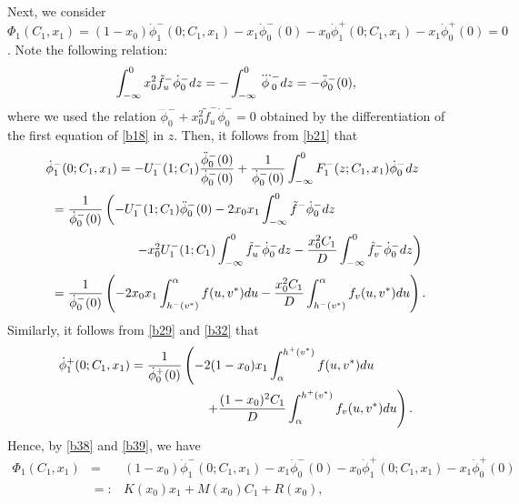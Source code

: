 \documentclass[a4,10pt]{article}
\begin{document}
Next, we consider
$\Phi_1(C_1,x_1) = (1-x_0) \dot{\phi}^-_1(0;C_1,x_1) - x_1  \dot{\phi}^-_0(0) - x_0  \dot{\phi}^+_1(0;C_1,x_1) - x_1  \dot{\phi}^+_0(0) = 0$.
Note the following relation: 
%
\[
\displaystyle\int_{-\infty}^0 x_0^2 \tilde{f}^-_u  \dot{\phi}^-_0 dz
=
 - \displaystyle\int_{-\infty}^0 \dddot{\phi}^-_0  dz
= 
-  \ddot{\phi}^-_0 (0), 
\]
%
where we used the relation $\dddot{\phi}^-_0 + x_0^2 \tilde{f}_u^- \dot{\phi}_0^- = 0$ obtained by
the differentiation of the first equation of \eqref{b18} in $z$. 
Then, it follows from \eqref{b21} that
%
\begin{equation}\label{b38}
\begin{array}{l}
 \dot{\phi}^-_1(0;C_1,x_1) 
= \displaystyle  -U^-_1(1;C_1)\frac {\ddot{\phi}^-_0 (0)}{\dot{\phi}_0^-(0)} + 
 \frac{1}{\dot{\phi}_0^-(0)}\displaystyle\int_{-\infty}^0 F_1^-(z;C_1,x_1) \dot{\phi}^-_0 dz
\\[3ex]
\ \ =
\displaystyle\frac{1}{\dot{\phi}_0^-(0)} \left(   -U^-_1(1;C_1)\ddot{\phi}^-_0 (0) 
-2x_0 x_1 \displaystyle\int_{-\infty}^0  \tilde{f}^- \dot{\phi}^-_0 dz \right. \\[3ex]
\left. \hspace*{2.5cm} - x_0^2 U^-_1(1;C_1) \displaystyle\int_{-\infty}^0  \tilde{f}^-_u \dot{\phi}^-_0 dz
 - \frac{ x_0^2 C_1 }{D} \displaystyle\int_{-\infty}^0 \tilde{f}^-_v \dot{\phi}^-_0 dz \right)
\\[3ex]
\ \ = 
\displaystyle\frac{1}{\dot{\phi}_0^-(0)} \left(
-2x_0 x_1 \displaystyle\int_{h^-(v^*)}^\alpha  f(u, v^*) du
- \displaystyle\frac{ x_0^2 C_1 }{D} \displaystyle\int_{h^-(v^*)}^\alpha  f_v(u, v^*) du \right). 
\end{array}
\end{equation}
%
Similarly, it follows from \eqref{b29} and \eqref{b32} that
%
\begin{equation}\label{b39}
\begin{array}{l}
\dot{\phi}^+_1(0;C_1,x_1)  
= 
\dis\frac{1}{\dot{\phi}_0^+(0)} \left(
-2(1-x_0 ) x_1 \dis\int^{h^+(v^*)}_\alpha  f(u, v^*) du \right.
\\[3ex]
\ \ \ \ \ \ \ \ \ \ \ \ \ \ \ \ \ \ \ \ \ \ \ \ \ \ \ \ \ \ \ \ \ \ \ 
\left. + \dis\frac{ (1-x_0)^2 C_1 }{D} \dis\int^{h^+(v^*)}_\alpha  f_v(u, v^*) du \right).
\end{array}
\end{equation}
%
Hence, by \eqref{b38} and \eqref{b39}, we have
%
\[
\begin{array}{rcl}
\Phi_1(C_1,x_1) & = & (1-x_0) \dot{\phi}^-_1(0;C_1,x_1) - x_1  \dot{\phi}^-_0(0) - x_0  \dot{\phi}^+_1(0;C_1,x_1) - x_1  \dot{\phi}^+_0(0)
\\[2ex]
& =: & K(x_0)x_1 + M(x_0)C_1 + R(x_0),
\end{array}
\]
\end{document}
